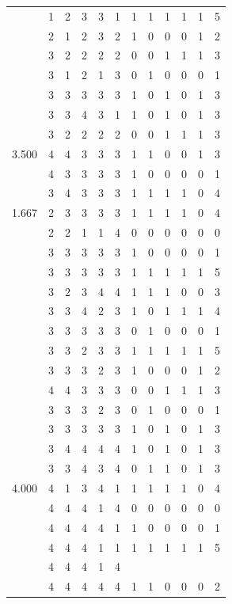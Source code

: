 \documentclass[]{book}
\theoremstyle{definition}
\theoremstyle{definition}
\theoremstyle{definition}
\theoremstyle{remark}
\begin{document}
\begin{table}
{\begin{tabular}[t]{rrrrrrrrrrrr}
 & 1 & 2 & 3 & 3 & 1 & 1 & 1 & 1 & 1 & 1 & 5\\
 & 2 & 1 & 2 & 3 & 2 & 1 & 0 & 0 & 0 & 1 & 2\\
 & 3 & 2 & 2 & 2 & 2 & 0 & 0 & 1 & 1 & 1 & 3\\
 & 3 & 1 & 2 & 1 & 3 & 0 & 1 & 0 & 0 & 0 & 1\\
 & 3 & 3 & 3 & 3 & 3 & 1 & 0 & 1 & 0 & 1 & 3\\
 & 3 & 3 & 4 & 3 & 1 & 1 & 0 & 1 & 0 & 1 & 3\\
 & 3 & 2 & 2 & 2 & 2 & 0 & 0 & 1 & 1 & 1 & 3\\
3.500 & 4 & 4 & 3 & 3 & 3 & 1 & 1 & 0 & 0 & 1 & 3\\
 & 4 & 3 & 3 & 3 & 3 & 1 & 0 & 0 & 0 & 0 & 1\\
 & 3 & 4 & 3 & 3 & 3 & 1 & 1 & 1 & 1 & 0 & 4\\
1.667 & 2 & 3 & 3 & 3 & 3 & 1 & 1 & 1 & 1 & 0 & 4\\
 & 2 & 2 & 1 & 1 & 4 & 0 & 0 & 0 & 0 & 0 & 0\\
 & 3 & 3 & 3 & 3 & 3 & 1 & 0 & 0 & 0 & 0 & 1\\
 & 3 & 3 & 3 & 3 & 3 & 1 & 1 & 1 & 1 & 1 & 5\\
 & 3 & 2 & 3 & 4 & 4 & 1 & 1 & 1 & 0 & 0 & 3\\
 & 3 & 3 & 4 & 2 & 3 & 1 & 0 & 1 & 1 & 1 & 4\\
 & 3 & 3 & 3 & 3 & 3 & 0 & 1 & 0 & 0 & 0 & 1\\
 & 3 & 3 & 2 & 3 & 3 & 1 & 1 & 1 & 1 & 1 & 5\\
 & 3 & 3 & 3 & 2 & 3 & 1 & 0 & 0 & 0 & 1 & 2\\
 & 4 & 4 & 3 & 3 & 3 & 0 & 0 & 1 & 1 & 1 & 3\\
 & 3 & 3 & 3 & 2 & 3 & 0 & 1 & 0 & 0 & 0 & 1\\
 & 3 & 3 & 3 & 3 & 3 & 1 & 0 & 1 & 0 & 1 & 3\\
 & 3 & 4 & 4 & 4 & 4 & 1 & 0 & 1 & 0 & 1 & 3\\
 & 3 & 3 & 4 & 3 & 4 & 0 & 1 & 1 & 0 & 1 & 3\\
4.000 & 4 & 1 & 3 & 4 & 1 & 1 & 1 & 1 & 1 & 0 & 4\\
 & 4 & 4 & 4 & 1 & 4 & 0 & 0 & 0 & 0 & 0 & 0\\
 & 4 & 4 & 4 & 4 & 1 & 1 & 0 & 0 & 0 & 0 & 1\\
 & 4 & 4 & 4 & 1 & 1 & 1 & 1 & 1 & 1 & 1 & 5\\
 & 4 & 4 & 4 & 1 & 4 &  &  &  &  &  & \\
 & 4 & 4 & 4 & 4 & 4 & 1 & 1 & 0 & 0 & 0 & 2\\

\end{tabular}}
\end{table}
\end{document}
